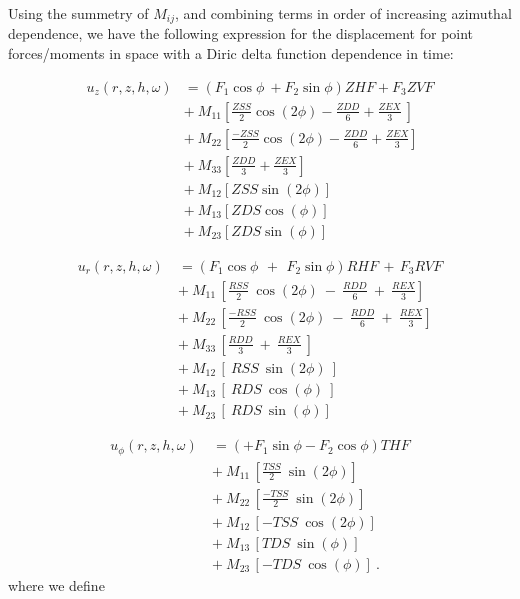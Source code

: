 \documentclass{article}
\begin{document}
Using the summetry of $ M_{ij}$,
and combining terms in order of increasing azimuthal dependence,
we have the following expression for the displacement for point forces/moments in space with a Diric delta function dependence in time:

\begin{align*}
u_z (r,z,h, \omega )   &= ( F_1 \cos \phi\ +  F_2 \sin \phi ) ZHF + F_3 ZVF \\
 &+ \ M_{11}  \left[   \frac{ ZSS   }{ 2 }  \cos ( 2 \phi )  - \frac{ ZDD   }{ 6 } +  \frac{ ZEX   }{ 3 }\ \right] \\
 &+ \  M_{22}  \left[ \frac{ -ZSS   }{ 2 }  \cos ( 2 \phi )  - \frac{ ZDD   }{ 6 } +  \frac{ ZEX   }{ 3 }\right] \\
 &+ \  M_{33}  \left[ \frac{ ZDD   }{ 3 } +  \frac{ ZEX   }{ 3 }\right] \\
 &+ \  M_{12}  \left[ ZSS   \sin ( 2 \phi ) \right] \\
 &+ \  M_{13}  \left[ ZDS   \cos ( \phi ) \right] \\
 &+ \  M_{23}  \left[ ZDS   \sin ( \phi ) \right] 
\end{align*}

\begin{align*}
u_r (r,z,h, \omega )\   &=
( F_1 \cos \phi\ \,+\,\  F_2 \sin \phi ) RHF \,+\, F_3 RVF \\
 \ \ \ \ &+ \  M_{11}
\, \left[ \frac{ RSS   }{ 2 }\  \cos ( 2 \phi ) \ -\ 
\frac{ RDD   }{ 6 }\ +\  \frac{ REX   }{ 3 }\right] \\
 \ \ \ \ &+ \  M_{22} \, \left[ \frac{ -RSS   }{ 2 }\  \cos ( 2 \phi ) \ -\ 
\frac{ RDD   }{ 6 }\ +\  \frac{ REX   }{ 3 }\right] \\
 \ \ \ \ &+ \  M_{33} \, \left[ \frac{ RDD   }{ 3 }\ +\  \frac{ REX   }{ 3 }\  \right] \\
 \ \ \ \ &+ \  M_{12} \, \left[ \  RSS \  \sin ( 2 \phi ) \  \right] \\
 \ \ \ \ &+ \  M_{13} \, \left[ \  RDS \  \cos ( \phi ) \  \right] \\
 \ \ \ \ &+ \  M_{23} \, \left[ \  RDS \  \sin ( \phi ) \right]
\end{align*}

\begin{align*}
u_{\phi} (r,z,h, \omega )\   &= ( + F_1 \sin \phi - F_2 \cos \phi ) THF \\
 \ \ \ \ &+ \ M_{11} \, \left[ \frac{ TSS   }{ 2 }\  \sin ( 2 \phi ) \right] \\
 \ \ \ \ &+ \  M_{22} \, \left[ \frac{ -TSS   }{ 2 }\  \sin ( 2 \phi ) \right] \\
 \ \ \ \ &+ \  M_{12} \, \left[ -TSS \  \cos ( 2 \phi ) \right] \\
 \ \ \ \ &+ \  M_{13} \, \left[ TDS \  \sin ( \phi ) \right] \\
 \ \ \ \ &+ \  M_{23} \, \left[ -TDS \  \cos ( \phi ) \right]\ . 
\end{align*}
where we define 
\end{document}
